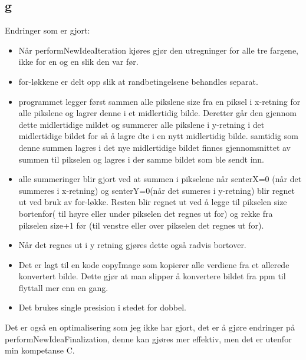 \documentclass[12pt, a4paper]{article} %
\begin{document}
\subsection*{g}
Endringer som er gjort:
\begin{itemize}
\item Når performNewIdeaIteration kjøres gjør den utregninger for alle tre fargene, ikke for en og en slik den var før.
\item for-løkkene er delt opp slik at randbetingelsene behandles separat.
\item programmet legger først sammen alle pikslene size fra en piksel i x-retning for alle pikslene og lagrer denne i et midlertidig bilde. Deretter går den gjennom dette midlertidige mildet og summerer alle pikslene i y-retning i det midlertidige bildet for så å lagre dte i en nytt midlertidig bilde. samtidig som denne summen lagres i det nye midlertidige bildet finnes gjennomsnittet av summen til pikselen og lagres i der samme bildet som ble sendt inn. 
\item alle summeringer blir gjort ved at summen i pikselene når senterX=0 (når det summeres i x-retning) og senterY=0(når det sumeres i y-retning) blir regnet ut ved bruk av for-løkke. Resten blir regnet ut ved å legge til pikselen size bortenfor( til høyre eller under pikselen det regnes ut for) og rekke fra pikselen size+1 før (til venstre eller over pikselen det regnes ut for).
\item Når det regnes ut i y retning gjøres dette også radvis bortover. 
\item Det er lagt til en kode copyImage som kopierer alle verdiene fra et allerede konvertert bilde. Dette gjør at man slipper å konvertere bildet fra ppm til flyttall mer enn en gang.
\item Det brukes single presision i stedet for dobbel. 
\end{itemize}

Det er også en optimalisering som jeg ikke har gjort, det er å gjøre endringer på performNewIdeaFinalization, denne kan gjøres mer effektiv, men det er utenfor min kompetanse  C.
\end{document}

